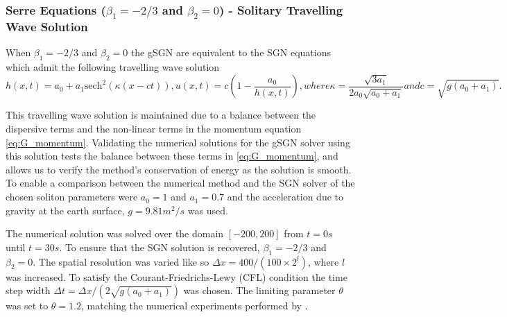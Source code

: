\documentclass[10pt]{elsarticle}
\begin{document}
\subsubsection{Serre Equations ($\beta_1 = -2/3$ and $\beta_2 = 0$) - Solitary Travelling Wave Solution}
When $\beta_1 = -2/3$ and $\beta_2 = 0$ the gSGN are equivalent to the SGN equations which admit the following travelling wave solution
\begin{subequations}
	\begin{equation}
	h(x,t) = a_0 + a_1 \text{sech}^2\left( \kappa (x - ct) \right),
	\end{equation}
	\begin{equation}
	u(x,t) = c \left( 1- \dfrac{a_0}{h(x,t)} \right),
	\end{equation}
	where
	\begin{equation}
	\kappa = \dfrac{\sqrt{3a_1}}{2a_0 \sqrt{a_0 + a_1}}
	\end{equation}
	and
	\begin{equation}
	c = \sqrt{g\left(a_0 + a_1\right)}.
	\end{equation}
\end{subequations}

This travelling wave solution is maintained due to a balance between the dispersive terms and the non-linear terms in the momentum equation \eqref{eq:G_momentum}. Validating the numerical solutions for the gSGN solver using this solution tests the balance between these terms in \eqref{eq:G_momentum}, and allows us to verify the method's conservation of energy as the solution is smooth. To enable a comparison between the numerical method and the SGN solver of \cite{Zoppou-etal-2017} the chosen soliton parameters were $a_0 = 1$ and $a_1 = 0.7$ and the acceleration due to gravity at the earth surface, $g = 9.81 m^2/s$ was used.

The numerical solution was solved over the domain $\left[-200,200\right]$ from $t=0s$ until $t=30s$. To ensure that the SGN solution is recovered, $\beta_1 = -2/3$ and $\beta_2 = 0$. The spatial resolution was varied like so $\Delta x = 400 / (100 \times 2^{l})$, where $l$ was increased. To satisfy the Courant-Friedrichs-Lewy (CFL) condition \cite{Lax-Richtmyer-1956-267} the time step width $\Delta t = \Delta x  / \left( 2 \sqrt{g \left(a_0 + a_1\right)}\right)$ \cite{Pitt-2019} was chosen. The limiting parameter $\theta$ was set to $\theta = 1.2$, matching the numerical experiments performed by \citet{Pitt-2019}.
\end{document}
